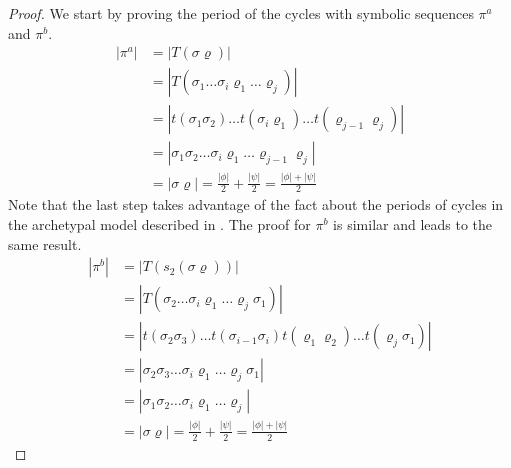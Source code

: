 \begin{proof}
	We start by proving the period of the cycles with symbolic sequences $\pi^a$ and $\pi^b$.
	\begin{align*}
		|\pi^a| & = |T(\sigma\varrho)|                                                                \\
		        & = |T(\sigma_1 \dots \sigma_i \varrho_1 \dots \varrho_j)|                            \\
		        & = |t(\sigma_1\sigma_2) \dots t(\sigma_i\varrho_1) \dots t(\varrho_{j-1}\varrho_j)|  \\
		        & = |\sigma_1\sigma_2 \dots \sigma_i \varrho_1 \dots \varrho_{j-1}\varrho_j|          \\
		        & = |\sigma\varrho| = \frac{|\phi|}{2} + \frac{|\psi|}{2} = \frac{|\phi| + |\psi|}{2}
	\end{align*}
	Note that the last step takes advantage of the fact about the periods of cycles in the archetypal model described in .
	The proof for $\pi^b$ is similar and leads to the same result.
	\begin{align*}
		|\pi^b| & = |T(s_2(\sigma\varrho))|                                                                              \\
		        & = |T(\sigma_2 \dots \sigma_i \varrho_1 \dots \varrho_j \sigma_1)|                                      \\
		        & = |t(\sigma_2\sigma_3) \dots t(\sigma_{i-1}\sigma_i) t(\varrho_1\varrho_2) \dots t(\varrho_j\sigma_1)| \\
		        & = |\sigma_2\sigma_3 \dots \sigma_i \varrho_1 \dots \varrho_j \sigma_1|                                 \\
		        & = |\sigma_1\sigma_2 \dots \sigma_i \varrho_1 \dots \varrho_j|                                          \\
		        & = |\sigma\varrho| = \frac{|\phi|}{2} + \frac{|\psi|}{2} = \frac{|\phi| + |\psi|}{2}
	\end{align*}


\end{proof}
